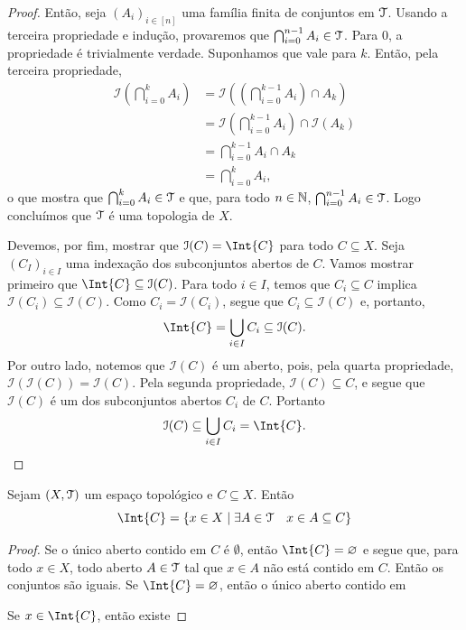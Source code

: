 \begin{proof}
	Então, seja $(A_i)_{i \in [n]}$ uma família finita de conjuntos em $\mathcal{T}$. Usando a terceira propriedade e indução, provaremos que $\bigcap_{i=0}^{n-1} A_i \in \mathcal{T}$. Para $0$, a propriedade é trivialmente verdade. Suponhamos que vale para $k$. Então, pela terceira propriedade,
	\begin{align*}
	\mathcal I \left( \bigcap_{i=0}^{k} A_i \right)
	&= \mathcal I \left( \left( \bigcap_{i=0}^{k-1} A_i \right) \cap A_{k} \right) \\
	&= \mathcal I \left( \bigcap_{i=0}^{k-1} A_i \right) \cap \mathcal I \left( A_{k} \right) \\
	&= \bigcap_{i=0}^{k-1} A_i \cap A_{k} \\
	&= \bigcap_{i=0}^{k} A_i,
	\end{align*}
o que mostra que $\bigcap_{i=0}^{k} A_i \in \mathcal{T}$ e que, para todo $n \in \mathbb{N}$, $\bigcap_{i=0}^{n-1} A_i \in \mathcal{T}$. Logo concluímos que $\mathcal{T}$ é uma topologia de $X$.

Devemos, por fim, mostrar que $\mathcal I(C)=\Int{C}$ para todo $C \subseteq X$. Seja $(C_I)_{i \in I}$ uma indexação dos subconjuntos abertos de $C$. Vamos mostrar primeiro que $\Int{C} \subseteq \mathcal I(C)$. Para todo $i \in I$, temos que $C_i \subseteq C$ implica $\mathcal I(C_i) \subseteq \mathcal I(C)$. Como $C_i = \mathcal I(C_i)$, segue que $C_i \subseteq \mathcal I(C)$ e, portanto,
	\begin{equation*}
	\Int{C} = \bigcup_{i \in I} C_i \subseteq \mathcal I(C).
	\end{equation*}
	Por outro lado, notemos que $\mathcal I(C)$ é um aberto, pois, pela quarta propriedade, $\mathcal I(\mathcal I(C))= \mathcal I(C)$. Pela segunda propriedade, $\mathcal I(C) \subseteq C$, e segue que $\mathcal I(C)$ é um dos subconjuntos abertos $C_i$ de $C$. Portanto	
	\begin{equation*}
	\mathcal I(C) \subseteq \bigcup_{i \in I} C_i = \Int{C}.
	\end{equation*}
\end{proof}

\begin{prop}
	Sejam $(X, \mathcal{T})$ um espaço topológico e $C \subseteq X$. Então
	\begin{equation*}
	\Int{C} = \set{x \in X}{\exists A \in \topo \quad x \in A \subseteq C}
	\end{equation*}
\end{prop}
\begin{proof}
	Se o único aberto contido em $C$ é $\emptyset$, então $\Int{C}=\emptyset$ e segue que, para todo $x \in X$, todo aberto $A \in \mathcal{T}$ tal que $x \in A$ não está contido em $C$. Então os conjuntos são iguais.
	Se $\Int{C}=\emptyset$, então o único aberto contido em 
	
	
	Se $x \in \Int{C}$, então existe
\end{proof}

